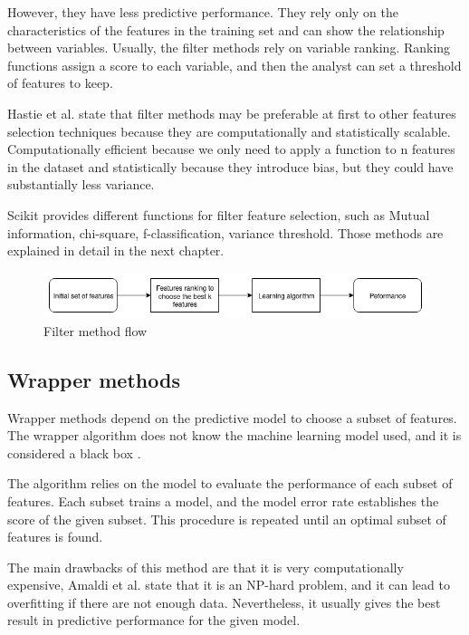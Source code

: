 However, they have less predictive performance.  They rely only on the characteristics of the features in the training set and can show the relationship between variables. \cite{sanchez2007filter}
Usually, the filter methods rely on variable ranking. Ranking functions assign a score to each variable, and then the analyst can set a threshold of features to keep. 

Hastie et al. \cite{hastie2009elements} state that filter methods may be preferable at first to other features selection techniques because they are computationally and statistically scalable.  Computationally efficient because we only need to apply a function to n features in the dataset and statistically because they introduce bias, but they could have substantially less variance.

Scikit provides different functions for filter feature selection, such as Mutual information, chi-square, f-classification, variance threshold. Those methods are explained in detail in the next chapter.

\begin{figure}[!h]
	\centering
	\includegraphics[width=1.0\columnwidth]{filter}
	\caption{Filter method flow}
	\label{fig:filter}
\end{figure}


\subsection{Wrapper methods}
\label{sec:wrapper}
Wrapper methods depend on the predictive model to choose a subset of features. The wrapper algorithm does not know the machine learning model used, and it is considered a black box \cite{kohavi1997wrappers}. 

The algorithm relies on the model to evaluate the performance of each subset of features. Each subset trains a model, and the model error rate establishes the score of the given subset. This procedure is repeated until an optimal subset of features is found. 

The main drawbacks of this method are that it is very computationally expensive, Amaldi et al. \cite{amaldi1998approximability} state that it is an NP-hard problem, and it can lead to overfitting if there are not enough data. Nevertheless, it usually gives the best result in predictive performance for the given model. \\

